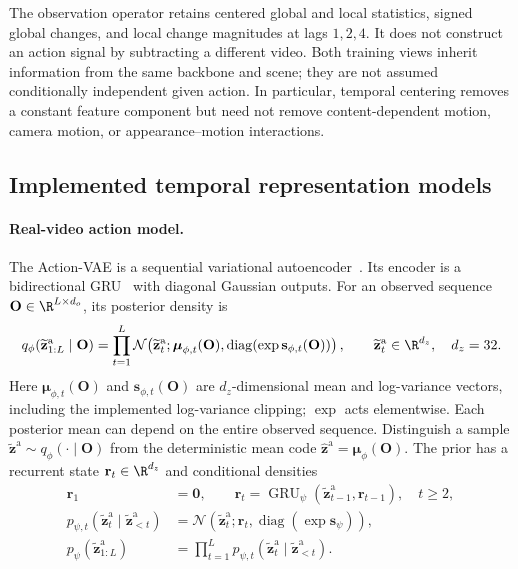 The observation operator retains centered global and local statistics,
signed global changes, and local change magnitudes at lags $1,2,4$.
It does not construct an action signal by subtracting a different video.
Both training views inherit information from the same backbone and scene;
they are not assumed conditionally independent given action. In particular,
temporal centering removes a constant feature component but need not
remove content-dependent motion, camera motion, or appearance--motion
interactions.

\subsection{Implemented temporal representation models}
\label{subsec:impl-representation-model}

\paragraph{Real-video action model.}
The Action-VAE is a sequential variational autoencoder~\citep{kingma2014vae}.
Its encoder is a bidirectional GRU~\citep{cho2014gru} with diagonal Gaussian outputs.
For an observed sequence $\mathbf O\in\R^{L\times d_o}$, its posterior density is
\begin{equation}
  q_\phi(\widetilde{\mathbf z}^{\mathrm a}_{1:L}\mid \mathbf O)
  =\prod_{t=1}^{L}
    \mathcal N\!\left(\widetilde{\mathbf z}^{\mathrm a}_t;\boldsymbol\mu_{\phi,t}(\mathbf O),
       \operatorname{diag}(\exp \mathbf s_{\phi,t}(\mathbf O))\right),
  \qquad \widetilde{\mathbf z}^{\mathrm a}_t\in\R^{d_z},\quad d_z=32.
  \label{eq:impl-posterior}
\end{equation}
Here $\boldsymbol\mu_{\phi,t}(\mathbf O)$ and $\mathbf s_{\phi,t}(\mathbf O)$ are $d_z$-dimensional mean and
log-variance vectors, including the implemented log-variance clipping;
$\exp$ acts elementwise. Each posterior mean can depend on the entire
observed sequence. Distinguish a sample $\widetilde{\mathbf z}^{\mathrm a}\sim q_\phi(\cdot\mid \mathbf O)$ from
the deterministic mean code $\widehat{\mathbf z}^{\mathrm a}=\boldsymbol\mu_\phi(\mathbf O)$.
The prior has a recurrent state $\mathbf r_t\in\R^{d_z}$ and conditional densities
\begin{equation}
 \begin{aligned}
  \mathbf r_1&=\mathbf 0,\qquad
  \mathbf r_t=\operatorname{GRU}_\psi(\widetilde{\mathbf z}^{\mathrm a}_{t-1},\mathbf r_{t-1}),\quad t\geq2,\\
  p_{\psi,t}(\widetilde{\mathbf z}^{\mathrm a}_t\mid \widetilde{\mathbf z}^{\mathrm a}_{<t})
    &=\mathcal N\!\left(\widetilde{\mathbf z}^{\mathrm a}_t;\mathbf r_t,\operatorname{diag}(\exp \mathbf s_\psi)\right),\\
  p_\psi(\widetilde{\mathbf z}^{\mathrm a}_{1:L})&=\prod_{t=1}^{L}p_{\psi,t}(\widetilde{\mathbf z}^{\mathrm a}_t\mid \widetilde{\mathbf z}^{\mathrm a}_{<t}).
 \end{aligned}
 \label{eq:impl-recurrent-prior}
\end{equation}
